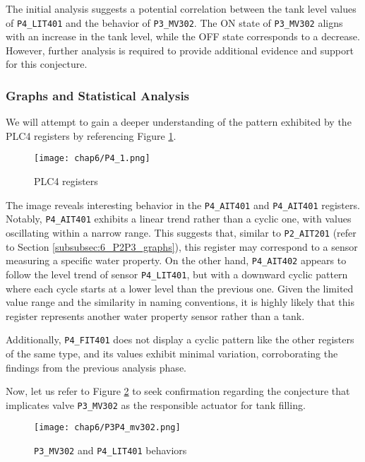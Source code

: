 The initial analysis suggests a potential correlation between the tank level values of \texttt{P4\_LIT401} and the behavior of \texttt{P3\_MV302}. The ON state of \texttt{P3\_MV302} aligns with an increase in the tank level, while the OFF state corresponds to a decrease. However, further analysis is required to provide additional evidence and support for this conjecture.
\vfill

\subsubsection{Graphs and Statistical Analysis}
\label{subsubsec:6_P3P4_graphs}
We will attempt to gain a deeper understanding of the pattern exhibited by the PLC4 registers by referencing Figure \ref{fig:6_graph_P4}.

\begin{figure}[ht]
	\centering
	\texttt{[image: chap6/P4\_1.png]}
	\caption{PLC4 registers}
	\label{fig:6_graph_P4}
\end{figure}

The image reveals interesting behavior in the \texttt{P4\_AIT401} and \texttt{P4\_AIT401} registers. Notably, \texttt{P4\_AIT401} exhibits a linear trend rather than a cyclic one, with values oscillating within a narrow range. This suggests that, similar to \texttt{P2\_AIT201} (refer to Section \ref{subsubsec:6_P2P3_graphs}), this register may correspond to a sensor measuring a specific water property. On the other hand, \texttt{P4\_AIT402} appears to follow the level trend of sensor \texttt{P4\_LIT401}, but with a downward cyclic pattern where each cycle starts at a lower level than the previous one. Given the limited value range and the similarity in naming conventions, it is highly likely that this register represents another water property sensor rather than a tank.

Additionally, \texttt{P4\_FIT401} does not display a cyclic pattern like the other registers of the same type, and its values exhibit minimal variation, corroborating the findings from the previous analysis phase.

\bigskip
Now, let us refer to Figure \ref{fig:6_graph_P3P4_mv302} to seek confirmation regarding the conjecture that implicates valve \texttt{P3\_MV302} as the responsible actuator for tank filling.

\begin{figure}[ht]
	\centering
	\texttt{[image: chap6/P3P4\_mv302.png]}
	\caption{\texttt{P3\_MV302} and \texttt{P4\_LIT401} behaviors}
	\label{fig:6_graph_P3P4_mv302}
\end{figure}

